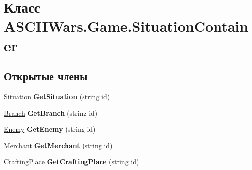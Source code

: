 \hypertarget{class_a_s_c_i_i_wars_1_1_game_1_1_situation_container}{}\section{Класс A\+S\+C\+I\+I\+Wars.\+Game.\+Situation\+Container}
\label{class_a_s_c_i_i_wars_1_1_game_1_1_situation_container}
\subsection*{Открытые члены}
\begin{DoxyCompactItemize}
\item 
\hypertarget{class_a_s_c_i_i_wars_1_1_game_1_1_situation_container_aad379806144d48b5d6c66e409065473c}{}\label{class_a_s_c_i_i_wars_1_1_game_1_1_situation_container_aad379806144d48b5d6c66e409065473c} 
\hyperlink{class_a_s_c_i_i_wars_1_1_game_1_1_situation}{Situation} {\bfseries Get\+Situation} (string id)
\item 
\hypertarget{class_a_s_c_i_i_wars_1_1_game_1_1_situation_container_a3bab9a3b20ced9a6b3408601ff381b51}{}\label{class_a_s_c_i_i_wars_1_1_game_1_1_situation_container_a3bab9a3b20ced9a6b3408601ff381b51} 
\hyperlink{class_a_s_c_i_i_wars_1_1_game_1_1_branch}{Branch} {\bfseries Get\+Branch} (string id)
\item 
\hypertarget{class_a_s_c_i_i_wars_1_1_game_1_1_situation_container_a559089971fe865f682768b43173181c4}{}\label{class_a_s_c_i_i_wars_1_1_game_1_1_situation_container_a559089971fe865f682768b43173181c4} 
\hyperlink{class_a_s_c_i_i_wars_1_1_game_1_1_enemy}{Enemy} {\bfseries Get\+Enemy} (string id)
\item 
\hypertarget{class_a_s_c_i_i_wars_1_1_game_1_1_situation_container_a1e6b56a5e6db3eec1b59414956c245ae}{}\label{class_a_s_c_i_i_wars_1_1_game_1_1_situation_container_a1e6b56a5e6db3eec1b59414956c245ae} 
\hyperlink{class_a_s_c_i_i_wars_1_1_game_1_1_merchant}{Merchant} {\bfseries Get\+Merchant} (string id)
\item 
\hypertarget{class_a_s_c_i_i_wars_1_1_game_1_1_situation_container_a537f25cbf5d97a989954c421b6ea1a21}{}\label{class_a_s_c_i_i_wars_1_1_game_1_1_situation_container_a537f25cbf5d97a989954c421b6ea1a21} 
\hyperlink{class_a_s_c_i_i_wars_1_1_game_1_1_crafting_place}{Crafting\+Place} {\bfseries Get\+Crafting\+Place} (string id)
\end{DoxyCompactItemize}
